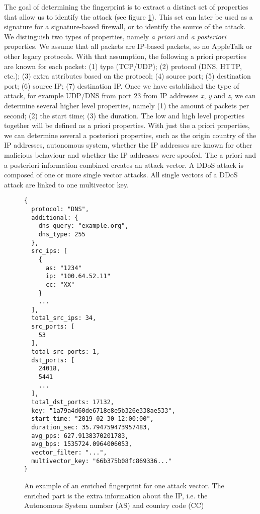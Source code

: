 The goal of determining the fingerprint is to extract a distinct set of properties that allow us to identify the attack (see figure \ref{fingerprint}). This set can later be used as a signature for a signature-based firewall, or to identify the source of the attack. We distinguish two types of properties, namely \emph{a priori} and \emph{a posteriori} properties. We assume that all packets are IP-based packets, so no AppleTalk or other legacy protocols. With that assumption, the following a priori properties are known for each packet: (1) type (TCP/UDP); (2) protocol (DNS, HTTP, etc.); (3) extra attributes based on the protocol; (4) source port; (5) destination port; (6) source IP; (7) destination IP. Once we have established the type of attack, for example UDP/DNS from port 23 from IP addresses \textit{x}, \textit{y} and \textit{z}, we can determine several higher level properties, namely (1) the amount of packets per second; (2) the start time; (3) the duration. The low and high level properties together will be defined as a priori properties. With just the a priori properties, we can determine several a posteriori properties, such as the origin country of the IP addresses, autonomous system, whether the IP addresses are known for other malicious behaviour and whether the IP addresses were spoofed. The a priori and a posteriori information combined creates an attack vector. A DDoS attack is composed of one or more single vector attacks. All single vectors of a DDoS attack are linked to one multivector key.

\begin{figure}
\begin{lstlisting}
{
  protocol: "DNS",
  additional: {
    dns_query: "example.org",
    dns_type: 255
  },
  src_ips: [
    {
      as: "1234"
      ip: "100.64.52.11"
      cc: "XX"
    }
    ...
  ],
  total_src_ips: 34,
  src_ports: [
    53
  ],
  total_src_ports: 1,
  dst_ports: [
    24018,
    5441
    ...
  ],
  total_dst_ports: 17132,
  key: "1a79a4d60de6718e8e5b326e338ae533",
  start_time: "2019-02-30 12:00:00",
  duration_sec: 35.794759473957483,
  avg_pps: 627.9138370201783,
  avg_bps: 1535724.0964006053,
  vector_filter: "...",
  multivector_key: "66b375b08fc869336..."
} 
\end{lstlisting}

\caption{An example of an enriched fingerprint for one attack vector. The enriched part is the extra information about the IP, i.e. the Autonomous System number (AS) and country code (CC)}
\label{fingerprint}
\end{figure}

